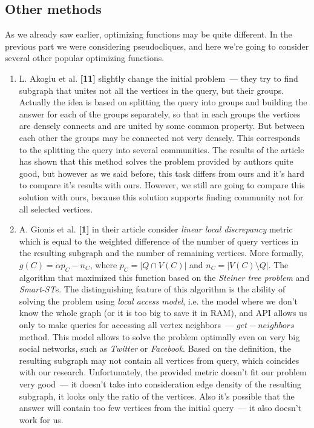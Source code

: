 \documentclass[11pt,a4paper,oneside]{article}
\begin{document}
\subsection{Other methods}

As we already saw earlier, optimizing functions may be quite different. In the previous part we were considering pseudocliques, and here we're going to consider several other popular optimizing functions.

\begin{enumerate}
  \item L. Akoglu et al. \textbf{[11]} slightly change the initial problem~--- they try to find subgraph that unites not all the vertices in the query, but their groups. Actually the idea is based on splitting the query into groups and building the answer for each of the groups separately, so that in each groups the vertices are densely connects and are united by some common property. But between each other the groups may be connected not very densely. This corresponds to the splitting the query into several communities. The results of the article has shown that this method solves the problem provided by authors quite good, but however as we said before, this task differs from ours and it's hard to compare it's results with ours. However, we still are going to compare this solution with ours, because this solution supports finding community not for all selected vertices. 

  \item A. Gionis et al. \textbf{[1]} in their article consider \textit{linear local discrepancy} metric which is equal to the weighted difference of the number of query vertices in the resulting subgraph and the number of remaining vertices. More formally, $g(C) = \alpha p_C - n_C$, where $p_C = |Q \cap V(C)|$ and $n_C = |V(C) \setminus Q|$. The algorithm that maximized this function based on the \textit{Steiner tree problem} and \textit{Smart-ST}s. The distinguishing feature of this algorithm is the ability of solving the problem using \textit{local access model}, i.e. the model where we don't know the whole graph (or it is too big to save it in RAM), and API allows us only to make queries for accessing all vertex neighbors~--- $get-neighbors$ method. This model allows to solve the problem optimally even on very big social networks, such as \textit{Twitter} or \textit{Facebook}. Based on the definition, the resulting subgraph may not contain all vertices from query, which coincides with our research. Unfortunately, the provided metric doesn't fit our problem very good~--- it doesn't take into consideration edge density of the resulting subgraph, it looks only the ratio of the vertices. Also it's possible that the answer will contain too few vertices from the initial query~--- it also doesn't work for us.
\end{enumerate}
\end{document}
